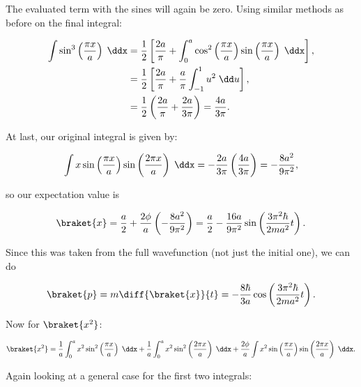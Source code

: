 The evaluated term with the sines will again be zero. Using similar methods as before on the final integral:

\begin{align*}
    \int\sin^3\left( \frac{\pi x}{a} \right)\;\ddx &= \frac{1}{2}\left[ \frac{2a}{\pi} + \int_0^a \cos^2\left( \frac{\pi x}{a} \right)\sin\left( \frac{\pi x}{a} \right)\;\ddx \right], \\
    &= \frac{1}{2} \left[\frac{2a}{\pi} + \frac{a}{\pi}\int_{-1}^1 u^2\;\dd u\right], \\
    &=\frac{1}{2}\left(\frac{2a}{\pi} + \frac{2a}{3\pi}\right) = \frac{4a}{3\pi}.
\end{align*}

At last, our original integral is given by:

\begin{equation*}
    \int x\sin\left( \frac{\pi x}{a} \right)\sin\left( \frac{2\pi x}{a} \right)\;\ddx = -\frac{2a}{3\pi} \left(\frac{4a}{3\pi}\right) = -\frac{8a^2}{9\pi^2},
\end{equation*}

so our expectation value is

\begin{equation*}
    \braket{x} = \frac{a}{2} + \frac{2\phi}{a} \left(-\frac{8a^2}{9\pi^2}\right) = \frac{a}{2} - \frac{16a}{9\pi^2}\sin\left( \frac{3\pi^2\hbar}{2ma^2}t\right).
\end{equation*}


Since this was taken from the full wavefunction (not just the initial one), we can do

\begin{equation*}
    \braket{p} = m\diff{\braket{x}}{t} = -\frac{8\hbar}{3a}\cos\left( \frac{3\pi^2\hbar}{2ma^2}t \right).
\end{equation*}




Now for $\braket{x^2}$:

\begin{equation*}
    \braket{x^2} = \frac{1}{a}\int_0^a x^2\sin^2 \left( \frac{\pi x}{a} \right)\;\ddx + \frac{1}{a} \int_0^a x^2\sin^2 \left( \frac{2\pi x}{a} \right)\;\ddx + \frac{2\phi}{a}\int x^2 \sin\left( \frac{\pi x}{a} \right)\sin\left( \frac{2\pi x}{a} \right)\;\ddx.
\end{equation*}

Again looking at a general case for the first two integrals:

